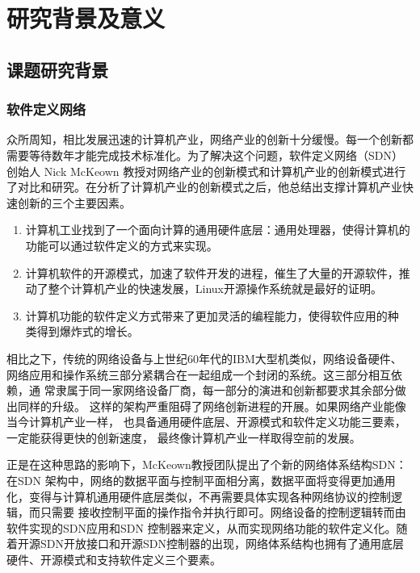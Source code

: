 \section{研究背景及意义}
\subsection{课题研究背景}
\subsubsection{软件定义网络}
众所周知，相比发展迅速的计算机产业，网络产业的创新十分缓慢。每一个创新都 需要等待数年才能完成技术标准化。为了解决这个问题，软件定义网络（SDN）创始人 Nick McKeown 教授对网络产业的创新模式和计算机产业的创新模式进行了对比和研究。在分析了计算机产业的创新模式之后，他总结出支撑计算机产业快速创新的三个主要因素。
\begin{enumerate}
  \item 计算机工业找到了一个面向计算的通用硬件底层：通用处理器，使得计算机的功能可以通过软件定义的方式来实现。
  \item 计算机软件的开源模式，加速了软件开发的进程，催生了大量的开源软件，推动了整个计算机产业的快速发展，Linux开源操作系统就是最好的证明。
  \item 计算机功能的软件定义方式带来了更加灵活的编程能力，使得软件应用的种 类得到爆炸式的增长。
\end{enumerate}

相比之下，传统的网络设备与上世纪60年代的IBM大型机类似，网络设备硬件、 网络应用和操作系统三部分紧耦合在一起组成一个封闭的系统。这三部分相互依赖，通 常隶属于同一家网络设备厂商，每一部分的演进和创新都要求其余部分做出同样的升级。 这样的架构严重阻碍了网络创新进程的开展。如果网络产业能像当今计算机产业一样， 也具备通用硬件底层、开源模式和软件定义功能三要素，一定能获得更快的创新速度， 最终像计算机产业一样取得空前的发展。

正是在这种思路的影响下，McKeown教授团队提出了个新的网络体系结构SDN\cite{mckeown2008openflow}： 在SDN 架构中，网络的数据平面与控制平面相分离，数据平面将变得更加通用化，变得与计算机通用硬件底层类似，不再需要具体实现各种网络协议的控制逻辑，而只需要 接收控制平面的操作指令并执行即可。网络设备的控制逻辑转而由软件实现的SDN应用和SDN 控制器来定义，从而实现网络功能的软件定义化。随着开源SDN开放接口和开源SDN控制器的出现，网络体系结构也拥有了通用底层硬件、开源模式和支持软件定义三个要素。

